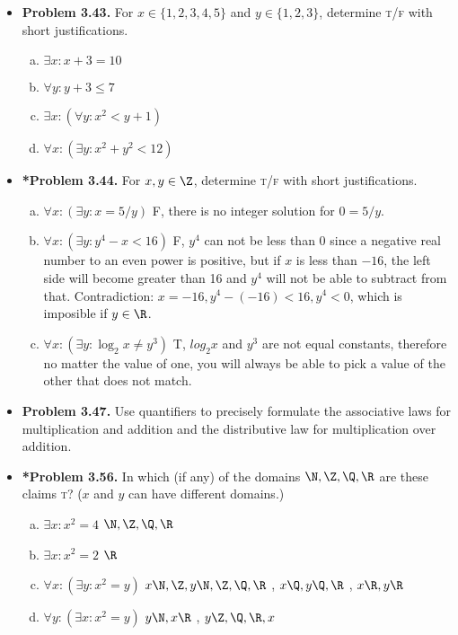\documentclass[11pt]{article}
\begin{document}
\begin{itemize}
\vspace{0.1in}

\item \textbf{Problem 3.43.}
  For $x\in\{1,2,3,4,5\}$ and $y\in\{1,2,3\}$,
  determine \textsc{t}/\textsc{f} with short justifications.
  \begin{enumerate}[(a)]
  \item $\exists x:x+3=10$
  \item $\forall y:y+3\le7$
  \item $\exists x:(\forall y:x^2<y+1)$
  \item $\forall x:(\exists y:x^2+y^2<12)$
  \end{enumerate}

\vspace{0.1in}

\item \textbf{*Problem 3.44.}
  For $x,y\in\Z$, determine \textsc{t}/\textsc{f} with short justifications.
  \begin{enumerate}[(a)]
  \item $\forall x:(\exists y:x=5/y)$ F, there is no integer solution for $0=5/y$.
  \item $\forall x:(\exists y:y^4-x<16)$ F, $y^4$ can not be less than $0$ since a negative real number to an even power is positive, but if $x$ is less than $-16$, the left side will become greater than 16 and $y^4$ will not be able to subtract from that. Contradiction: $x=-16, y^4-(-16)<16, y^4<0$, which is imposible if $y\in\R$.
  \item $\forall x:(\exists y:\log_2 x\ne y^3)$ T, $log_2 x$ and $y^3$ are not equal constants, therefore no matter the value of one, you will always be able to pick a value of the other that does not match.
  \end{enumerate}

\vspace{0.1in}

\item \textbf{Problem 3.47.}
  Use quantifiers to precisely formulate the associative laws
  for multiplication and addition and the distributive law
  for multiplication over addition.

\vspace{0.1in}

\item \textbf{*Problem 3.56.}
  In which (if any) of the domains $\N,\Z,\Q,\R$ are these claims \textsc{t}?
  ($x$ and $y$ can have different domains.)
  \begin{enumerate}[(a)]
  \item $\exists x:x^2=4$ $\N, \Z, \Q, \R$
  \item $\exists x:x^2=2$ $\R$
  \item $\forall x: (\exists y:x^2=y)$ $x \N,\Z, y \N,\Z,\Q,\R$ , $x \Q, y \Q,\R$ , $x \R, y \R$
  \item $\forall y: (\exists x:x^2=y)$ $y \N, x \R$ , $y \Z, \Q, \R, x$
  \end{enumerate}


\end{itemize}
\end{document}

